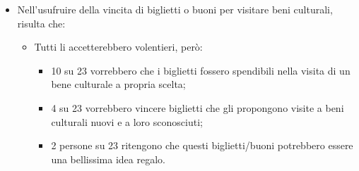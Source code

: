 \documentclass{article}
\begin{document}
\begin{itemize}
\begin{itemize}
	\end{itemize}
\item Nell'usufruire della vincita di biglietti o buoni per visitare beni culturali, risulta che:
	\begin{itemize}
	\item Tutti li accetterebbero volentieri, però:
		\begin{itemize}
		\item 10 su 23 vorrebbero che i biglietti fossero spendibili nella visita di un bene culturale a propria scelta;
		\item 4 su 23 vorrebbero vincere biglietti che gli propongono visite a beni culturali nuovi e a loro sconosciuti;
		\item 2 persone su 23 ritengono che questi biglietti/buoni potrebbero essere una bellissima idea regalo.
		\end{itemize}
	\end{itemize}
\end{itemize}
\end{document}
